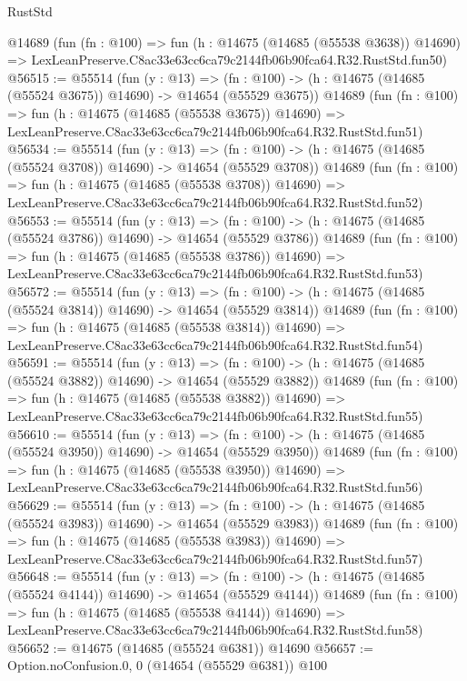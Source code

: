 \begin{lexlean}{RustStd}
\begin{coremodule}
    @14689
    (fun (fn : @100) =>
    fun (h : @14675 (@14685 (@55538 @3638)) @14690) =>
    LexLeanPreserve.C8ac33e63cc6ca79c2144fb06b90fca64.R32.RustStd.fun50)
@56515 := @55514
    (fun (y : @13) =>
    (fn : @100) -> (h : @14675 (@14685 (@55524 @3675)) @14690) -> @14654 (@55529 @3675))
    @14689
    (fun (fn : @100) =>
    fun (h : @14675 (@14685 (@55538 @3675)) @14690) =>
    LexLeanPreserve.C8ac33e63cc6ca79c2144fb06b90fca64.R32.RustStd.fun51)
@56534 := @55514
    (fun (y : @13) =>
    (fn : @100) -> (h : @14675 (@14685 (@55524 @3708)) @14690) -> @14654 (@55529 @3708))
    @14689
    (fun (fn : @100) =>
    fun (h : @14675 (@14685 (@55538 @3708)) @14690) =>
    LexLeanPreserve.C8ac33e63cc6ca79c2144fb06b90fca64.R32.RustStd.fun52)
@56553 := @55514
    (fun (y : @13) =>
    (fn : @100) -> (h : @14675 (@14685 (@55524 @3786)) @14690) -> @14654 (@55529 @3786))
    @14689
    (fun (fn : @100) =>
    fun (h : @14675 (@14685 (@55538 @3786)) @14690) =>
    LexLeanPreserve.C8ac33e63cc6ca79c2144fb06b90fca64.R32.RustStd.fun53)
@56572 := @55514
    (fun (y : @13) =>
    (fn : @100) -> (h : @14675 (@14685 (@55524 @3814)) @14690) -> @14654 (@55529 @3814))
    @14689
    (fun (fn : @100) =>
    fun (h : @14675 (@14685 (@55538 @3814)) @14690) =>
    LexLeanPreserve.C8ac33e63cc6ca79c2144fb06b90fca64.R32.RustStd.fun54)
@56591 := @55514
    (fun (y : @13) =>
    (fn : @100) -> (h : @14675 (@14685 (@55524 @3882)) @14690) -> @14654 (@55529 @3882))
    @14689
    (fun (fn : @100) =>
    fun (h : @14675 (@14685 (@55538 @3882)) @14690) =>
    LexLeanPreserve.C8ac33e63cc6ca79c2144fb06b90fca64.R32.RustStd.fun55)
@56610 := @55514
    (fun (y : @13) =>
    (fn : @100) -> (h : @14675 (@14685 (@55524 @3950)) @14690) -> @14654 (@55529 @3950))
    @14689
    (fun (fn : @100) =>
    fun (h : @14675 (@14685 (@55538 @3950)) @14690) =>
    LexLeanPreserve.C8ac33e63cc6ca79c2144fb06b90fca64.R32.RustStd.fun56)
@56629 := @55514
    (fun (y : @13) =>
    (fn : @100) -> (h : @14675 (@14685 (@55524 @3983)) @14690) -> @14654 (@55529 @3983))
    @14689
    (fun (fn : @100) =>
    fun (h : @14675 (@14685 (@55538 @3983)) @14690) =>
    LexLeanPreserve.C8ac33e63cc6ca79c2144fb06b90fca64.R32.RustStd.fun57)
@56648 := @55514
    (fun (y : @13) =>
    (fn : @100) -> (h : @14675 (@14685 (@55524 @4144)) @14690) -> @14654 (@55529 @4144))
    @14689
    (fun (fn : @100) =>
    fun (h : @14675 (@14685 (@55538 @4144)) @14690) =>
    LexLeanPreserve.C8ac33e63cc6ca79c2144fb06b90fca64.R32.RustStd.fun58)
@56652 := @14675 (@14685 (@55524 @6381)) @14690
@56657 := Option.noConfusion.{0, 0} (@14654 (@55529 @6381)) @100

\end{coremodule}
\end{lexlean}
